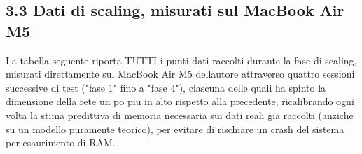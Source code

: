 \documentclass[
  italian,
]{article}
\begin{document}
\subsection{3.3 Dati di scaling, misurati sul MacBook Air M5}\label{dati-di-scaling-misurati-sul-macbook-air-m5}

La tabella seguente riporta TUTTI i punti dati raccolti durante la fase di scaling, misurati direttamente sul MacBook Air M5 dell\textquotesingle autore attraverso quattro sessioni successive di test ("fase 1" fino a "fase 4"), ciascuna delle quali ha spinto la dimensione della rete un po\textquotesingle{} piu\textquotesingle{} in alto rispetto alla precedente, ricalibrando ogni volta la stima predittiva di memoria necessaria sui dati reali gia\textquotesingle{} raccolti (anziche\textquotesingle{} su un modello puramente teorico), per evitare di rischiare un crash del sistema per esaurimento di RAM.
\end{document}
